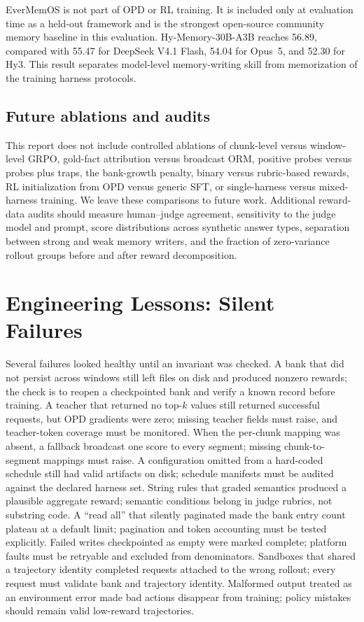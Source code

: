 \documentclass{article}
\begin{document}
EverMemOS is not part of OPD or RL training. It is included only at evaluation time as a held-out framework and is the strongest open-source community memory baseline in this evaluation. Hy-Memory-30B-A3B reaches 56.89, compared with 55.47 for DeepSeek V4.1 Flash, 54.04 for Opus~5, and 52.30 for Hy3. This result separates model-level memory-writing skill from memorization of the training harness protocols.

\subsection{Future ablations and audits}

This report does not include controlled ablations of chunk-level versus window-level GRPO, gold-fact attribution versus broadcast ORM, positive probes versus probes plus traps, the bank-growth penalty, binary versus rubric-based rewards, RL initialization from OPD versus generic SFT, or single-harness versus mixed-harness training. We leave these comparisons to future work. Additional reward-data audits should measure human--judge agreement, sensitivity to the judge model and prompt, score distributions across synthetic answer types, separation between strong and weak memory writers, and the fraction of zero-variance rollout groups before and after reward decomposition.

\section{Engineering Lessons: Silent Failures}

Several failures looked healthy until an invariant was checked. A bank that did not persist across windows still left files on disk and produced nonzero rewards; the check is to reopen a checkpointed bank and verify a known record before training. A teacher that returned no top-$k$ values still returned successful requests, but OPD gradients were zero; missing teacher fields must raise, and teacher-token coverage must be monitored. When the per-chunk mapping was absent, a fallback broadcast one score to every segment; missing chunk-to-segment mappings must raise. A configuration omitted from a hard-coded schedule still had valid artifacts on disk; schedule manifests must be audited against the declared harness set. String rules that graded semantics produced a plausible aggregate reward; semantic conditions belong in judge rubrics, not substring code. A ``read all'' that silently paginated made the bank entry count plateau at a default limit; pagination and token accounting must be tested explicitly. Failed writes checkpointed as empty were marked complete; platform faults must be retryable and excluded from denominators. Sandboxes that shared a trajectory identity completed requests attached to the wrong rollout; every request must validate bank and trajectory identity. Malformed output treated as an environment error made bad actions disappear from training; policy mistakes should remain valid low-reward trajectories.
\end{document}
